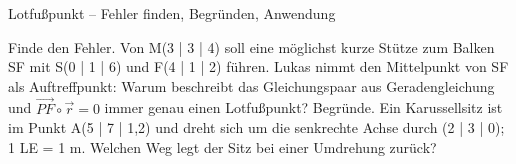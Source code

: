 
\begin{aufgabe}{Lotfußpunkt – Fehler finden, Begründen, Anwendung}
\begin{teile}
\teil Finde den Fehler. Von M(3 | 3 | 4) soll eine möglichst kurze Stütze zum Balken SF mit S(0 | 1 | 6) und F(4 | 1 | 2) führen. Lukas nimmt den Mittelpunkt von SF als Auftreffpunkt: 
\teil Warum beschreibt das Gleichungspaar aus Geradengleichung und $\overrightarrow{PF} \circ \vec r = 0$ immer genau einen Lotfußpunkt? Begründe.
\teil Ein Karussellsitz ist im Punkt A(5 | 7 | 1,2) und dreht sich um die senkrechte Achse durch (2 | 3 | 0); 1 LE = 1 m. Welchen Weg legt der Sitz bei einer Umdrehung zurück? \leerfeld[m]
\end{teile}
\end{aufgabe}
